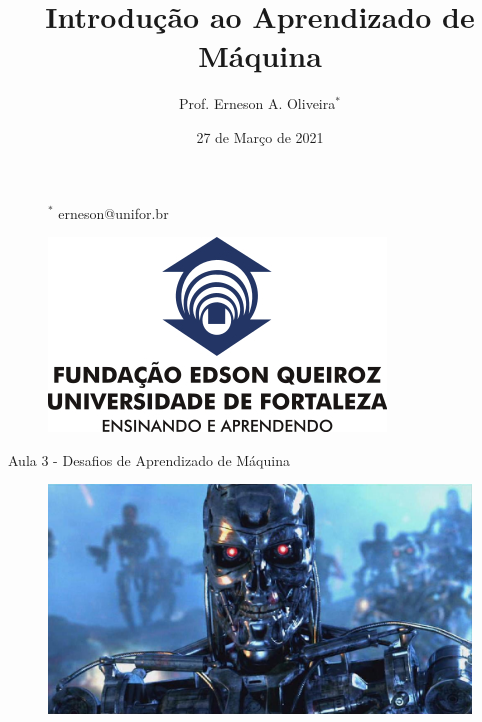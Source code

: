 \documentclass[12pt,mathserif,aspectratio=169]{beamer}
\title[Introdução ao Aprendizado de Máquina]{Introdução ao Aprendizado de Máquina}
\author[Prof. Erneson A. Oliveira]{Prof. Erneson A. Oliveira$^*$}
\institute[MBACD-UNIFOR]{MBA em Ciência de Dados\\Universidade de Fortaleza}
\date{27 de Março de 2021}
\begin{document}
\begin{frame}
    \vspace{1.0cm}
    \titlepage
    \vspace{-1.5cm}
    
    \begin{figure}
        \begin{minipage}{0.4\paperwidth}
            \vspace{1.75cm}
            \begin{flushleft}
                {\tiny $^*$ erneson@unifor.br}
            \end{flushleft}
        \end{minipage}
        \hfill
        \begin{minipage}{0.4\paperwidth}
            \vspace{-0.5cm}
            \begin{flushright}
                \includegraphics[width=0.2\paperwidth]{fig/UNIFOR.jpg}
            \end{flushright}
        \end{minipage}
    \end{figure}
\end{frame}

\begin{frame}
	\Large Aula 3 - Desafios de Aprendizado de Máquina
	\begin{figure}
		\includegraphics[width=0.8\paperwidth]{fig/skynet.jpg}
	\end{figure}
\end{frame}
\end{document}

